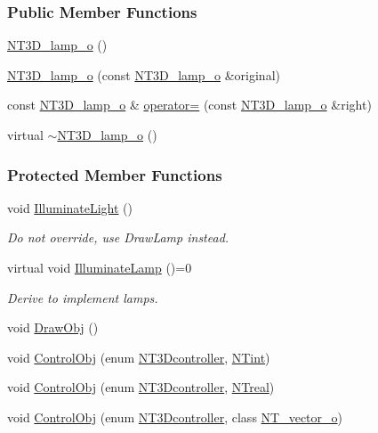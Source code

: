 \subsubsection*{Public Member Functions}
\begin{DoxyCompactItemize}
\item 
\hyperlink{class_n_t3_d__lamp__o_a31f4c3d36bc33fb7e674d0350637485e}{NT3D\_\-lamp\_\-o} ()
\item 
\hyperlink{class_n_t3_d__lamp__o_ad80a75847b039019d134b476131ae587}{NT3D\_\-lamp\_\-o} (const \hyperlink{class_n_t3_d__lamp__o}{NT3D\_\-lamp\_\-o} \&original)
\item 
const \hyperlink{class_n_t3_d__lamp__o}{NT3D\_\-lamp\_\-o} \& \hyperlink{class_n_t3_d__lamp__o_ac2e7a74f165da2f33b1db754cf606a9f}{operator=} (const \hyperlink{class_n_t3_d__lamp__o}{NT3D\_\-lamp\_\-o} \&right)
\item 
virtual \hyperlink{class_n_t3_d__lamp__o_a5c7b729ef879e910d726c48b74c16bd0}{$\sim$NT3D\_\-lamp\_\-o} ()
\end{DoxyCompactItemize}
\subsubsection*{Protected Member Functions}
\begin{DoxyCompactItemize}
\item 
void \hyperlink{class_n_t3_d__lamp__o_aceb22bc9ff63b94922833f27e7da741e}{IlluminateLight} ()
\begin{DoxyCompactList}\small\item\em Do not override, use DrawLamp instead. \item\end{DoxyCompactList}\item 
virtual void \hyperlink{class_n_t3_d__lamp__o_ab58e01b3f23fff831bd207f689640f79}{IlluminateLamp} ()=0
\begin{DoxyCompactList}\small\item\em Derive to implement lamps. \item\end{DoxyCompactList}\item 
void \hyperlink{class_n_t3_d__lamp__o_a7e051f01f52474d59db1684d1d07f64a}{DrawObj} ()
\item 
void \hyperlink{class_n_t3_d__lamp__o_ac37dea702ddd1615e7a51fa018e3ccbe}{ControlObj} (enum \hyperlink{nt3d__object__obj_8h_ae59ecf13a3631bc4a9ea41f90de08351}{NT3Dcontroller}, \hyperlink{nt__types_8h_aee8aa0a9869e8b5c97c6c02217ff09cd}{NTint})
\item 
void \hyperlink{class_n_t3_d__lamp__o_a19dccb31560ba79a593a2f79d33c5ff1}{ControlObj} (enum \hyperlink{nt3d__object__obj_8h_ae59ecf13a3631bc4a9ea41f90de08351}{NT3Dcontroller}, \hyperlink{nt__types_8h_a814a97893e9deb1eedcc7604529ba80d}{NTreal})
\item 
void \hyperlink{class_n_t3_d__lamp__o_ac4499b685b6391e60ed8d4d3c8aa8ef5}{ControlObj} (enum \hyperlink{nt3d__object__obj_8h_ae59ecf13a3631bc4a9ea41f90de08351}{NT3Dcontroller}, class \hyperlink{class_n_t__vector__o}{NT\_\-vector\_\-o})
\end{DoxyCompactItemize}
